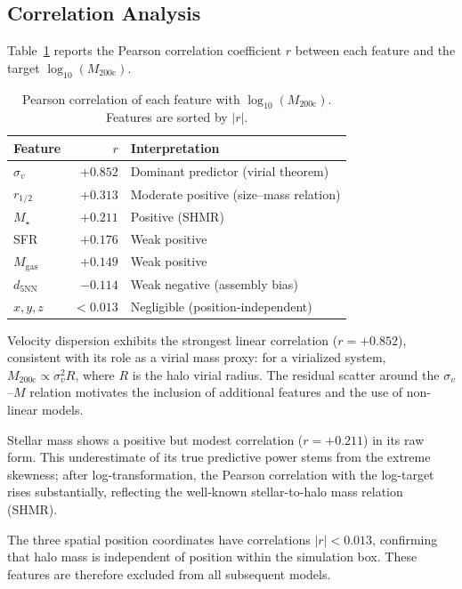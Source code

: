 \documentclass[12pt, a4paper]{article}
\newcommand{\Mhalo}{M_{200\mathrm{c}}}
\newcommand{\logMhalo}{\log_{10}(M_{200\mathrm{c}})}
\newcommand{\sigmav}{\sigma_v}
\newcommand{\Mstar}{M_\star}
\begin{document}
\subsection{Correlation Analysis}
\label{sec:correlations}

Table~\ref{tab:correlations} reports the Pearson correlation coefficient $r$ between each feature and the target $\logMhalo$.

\begin{table}[H]
  \centering
  \caption{Pearson correlation of each feature with $\logMhalo$.  Features are sorted by $|r|$.}
  \label{tab:correlations}
  \begin{tabular}{@{}lrl@{}}
    \toprule
    Feature & $r$ & Interpretation \\
    \midrule
    $\sigmav$              & $+0.852$ & Dominant predictor (virial theorem) \\
    $r_{1/2}$              & $+0.313$ & Moderate positive (size--mass relation) \\
    $\Mstar$               & $+0.211$ & Positive (SHMR) \\
    SFR                    & $+0.176$ & Weak positive \\
    $M_\mathrm{gas}$       & $+0.149$ & Weak positive \\
    $d_{5\mathrm{NN}}$     & $-0.114$ & Weak negative (assembly bias) \\
    $x, y, z$              & $< 0.013$ & Negligible (position-independent) \\
    \bottomrule
  \end{tabular}
\end{table}

Velocity dispersion exhibits the strongest linear correlation ($r = +0.852$), consistent with its role as a virial mass proxy: for a virialized system, $\Mhalo \propto \sigmav^2 R$, where $R$ is the halo virial radius.  The residual scatter around the $\sigmav$--$M$ relation motivates the inclusion of additional features and the use of non-linear models.

Stellar mass shows a positive but modest correlation ($r = +0.211$) in its raw form.  This underestimate of its true predictive power stems from the extreme skewness; after log-transformation, the Pearson correlation with the log-target rises substantially, reflecting the well-known stellar-to-halo mass relation (SHMR).

The three spatial position coordinates have correlations $|r| < 0.013$, confirming that halo mass is independent of position within the simulation box.  These features are therefore excluded from all subsequent models.
\end{document}
